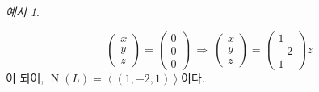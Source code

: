 \documentclass[unfonts,oneside,a4paper]{oblivoir}
\theoremstyle{definition}
\theoremstyle{theorem}
\theoremstyle{remark}
\theoremstyle{remark}
\theoremstyle{remark}
\newtheorem*{example}{예시}
\theoremstyle{remark}
\DeclareMathOperator{\Null}{N}
\begin{document}
\begin{example}
\begin{enumerate}
\begin{solution}
\begin{equation*}
\begin{pmatrix}
                    x \\ y \\ z
                    \end{pmatrix} = \begin{pmatrix}
                    0 \\ 0 \\ 0
                    \end{pmatrix} \ \Rightarrow \ \begin{pmatrix}
                    x \\ y \\ z
                    \end{pmatrix} = \begin{pmatrix}
                    1 \\ -2 \\ 1
                \end{pmatrix} z
            \end{equation*}
            이 되어, $\Null (L) = \left<(1, -2, 1)\right>$이다.
        \end{solution}


\end{enumerate}
\end{example}
\end{document}

